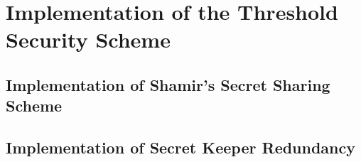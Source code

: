 \chapter{Implementation of the Threshold Security Scheme}

\section{Implementation of Shamir's Secret Sharing Scheme}

\section{Implementation of Secret Keeper Redundancy}